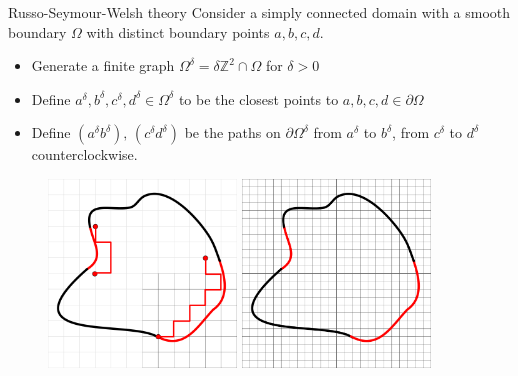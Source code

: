 \documentclass{beamer}
\begin{document}
\begin{frame}{Russo-Seymour-Welsh theory}
    Consider a simply connected domain with a smooth boundary $\Omega$ with distinct boundary points $a,b,c,d$.\\
    \begin{itemize}
        \item Generate a finite graph $\Omega^\delta=\delta\mathbb{Z}^2\cap\Omega$ for $\delta>0$
        \item Define $a^\delta, b^\delta, c^\delta, d^\delta\in\Omega^\delta$ to be the closest points to $a,b,c,d\in\partial\Omega$
        \item Define $(a^\delta b^\delta),\,(c^\delta d^\delta)$ be the paths on $\partial\Omega^\delta$ from $a^\delta$ to $b^\delta$, from $c^\delta$ to $d^\delta$ counterclockwise.
    \end{itemize}
    
    \begin{figure}[b]
        \includegraphics[width=5cm]{omega.png}
        \includegraphics[width=5cm]{omega_2.png}
    \end{figure}

\end{frame}
\end{document}
